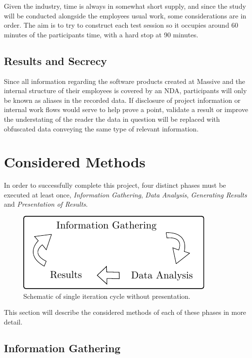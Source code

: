 \documentclass[10pt]{article}
\begin{document}
    Given the industry, time is always in somewhat short supply, and
    since the study will be conducted alongside the employees usual work, some
    considerations are in order. The aim is to try to construct each test
    session so it occupies around 60 minutes of the participants time, with a
    hard stop at 90 minutes.

  \subsection{Results and Secrecy}

    Since all information regarding the software products created at Massive
    and the internal structure of their employees is covered by an
    NDA\cite{c_nda}, participants will only be known as aliases in the recorded
    data. If disclosure of project information or internal work
    flows would serve to help prove a point, validate a result or improve the
    understating of the reader the data in question will be replaced with
    obfuscated data conveying the same type of relevant information.

\newpage
\section{Considered Methods}

  In order to successfully complete this project, four distinct phases must be
  executed at least once,
  \textit{Information Gathering},
  \textit{Data Analysis},
  \textit{Generating Results} and
  \textit{Presentation of Results}.

  \begin{figure}[!h]
    \center
    \includegraphics{images/project_cykle.pdf}
    \caption{Schematic of single iteration cycle without
      presentation.\label{fig_schematic_cycle}}
  \end{figure}

  This section will describe the considered methods of each of these phases in
  more detail.

  \subsection{Information Gathering}
\end{document}

